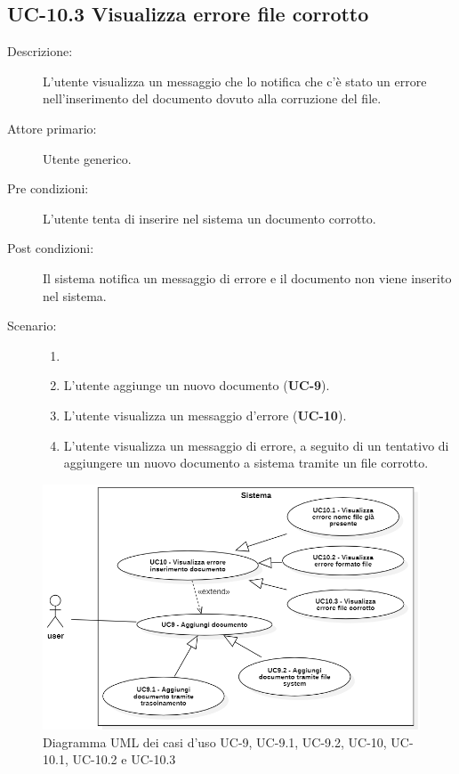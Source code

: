 \subsection{UC-10.3 Visualizza errore file corrotto}
\begin{description}
    \item[Descrizione:] L'utente visualizza un messaggio che lo notifica che c'è stato un errore nell'inserimento del documento dovuto alla corruzione del file.
    \item[Attore primario:] Utente generico.
    \item[Pre condizioni:] L'utente tenta di inserire nel sistema un documento corrotto.
    \item[Post condizioni:] Il sistema notifica un messaggio di errore e il documento non viene inserito nel sistema.
    \item[Scenario:]
    \begin{enumerate}
        \item[]
        \item L’utente aggiunge un nuovo documento (\textbf{UC-9}).
        \item L'utente visualizza un messaggio d'errore (\textbf{UC-10}).
        \item L'utente visualizza un messaggio di errore, a seguito di un tentativo di aggiungere un nuovo documento a sistema tramite un file corrotto.
    \end{enumerate}
\end{description}

\begin{figure}[H]
    \centering
    \includegraphics[width=\linewidth]{UC9-10.png} %
    \caption{Diagramma UML dei casi d'uso UC-9, UC-9.1, UC-9.2, UC-10, UC-10.1, UC-10.2 e UC-10.3}
    \label{fig:UC12-13}
\end{figure}

